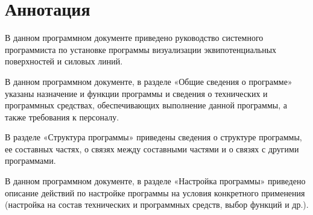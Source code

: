 \documentclass[14pt,a4paper,final]{extreport}
\renewcommand{\headrulewidth}{0pt}
\begin{document}
\raggedbottom

\newcommand{\fullname}{Егоров Александр Владиславович}
\newcommand{\shname}{Егоров А.В.}
\newcommand{\grp}{М3О-225БВ-24}
\newcommand{\variant}{5} %
\newcommand{\fieldA}{\( \vec a = y^2 \vec i + z^2 \vec j + x^2 \vec k \)}
\newcommand{\fieldB}{\( \vec b = (2xy^3z + y) \vec i + (3x^2y^2z + x) \vec j + (x^2y^3 + 4z^3) \vec k \)}

\newcommand{\cipher}{643.02066606.000\variant}
\newcommand{\cipherlri}{643.02066606.\\000\variant}
\newcommand{\docstamp}{\cipher-01 32 01}
\newcommand{\doctitle}{Программа визуализации\\эквипотенциальных поверхностей\\и силовых линий}
\newcommand{\docname}{Руководство системного программиста}

\pagebreak


\pagebreak

\parindent=1.25cm
\sloppy

\setcounter{page}{2}

\pagestyle{fancy}


\fancyhf{} %

\fancyhead[C]{\bfseries\thepage\\\docstamp}

\renewcommand{\headrulewidth}{0pt}
\pagebreak
\chapter*{Аннотация}

В данном программном документе приведено руководство системного программиста по установке программы визуализации эквипотенциальных поверхностей и силовых линий.

В данном программном документе, в разделе «Общие сведения о программе» указаны назначение и функции программы и сведения о технических и программных средствах, обеспечивающих выполнение данной программы, а также требования к персоналу.

В разделе «Структура программы» приведены сведения о структуре программы, ее составных частях, о связях между составными частями и о связях с другими программами.

В данном программном документе, в разделе «Настройка программы» приведено описание действий по настройке программы на условия конкретного применения (настройка на состав технических и программных средств, выбор функций и др.).
\end{document}
